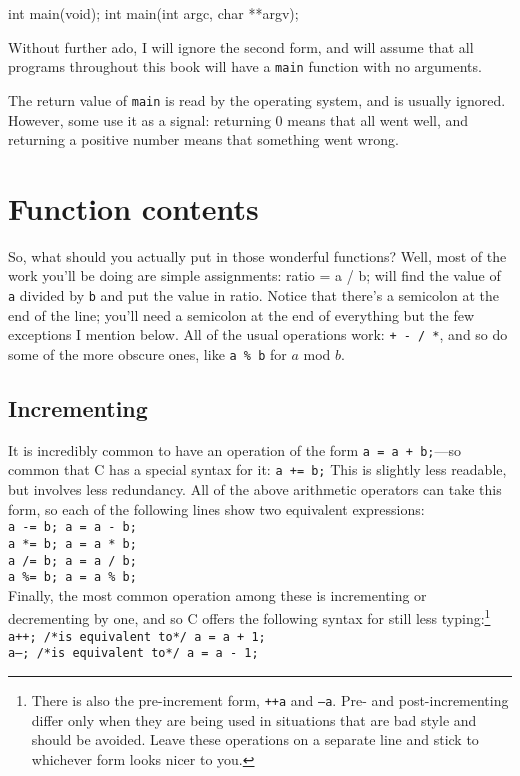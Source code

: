 \documentclass[12pt]{article}
\begin{document}
int main(void);
int main(int argc, char **argv);

Without further ado, I will ignore the second form, and will assume that all programs throughout this
book will have a {\tt main} function with no arguments.

The return value of {\tt main} is read by the operating system, and is usually ignored. However, some
use it as a signal:  returning 0 means that all went well, and returning a positive number means that
something went wrong.



\section{Function contents}

So, what should you actually put in those wonderful functions? Well, most of the work you'll be doing are
simple assignments:    \index{=}
ratio = a / b; 
will find the value of {\tt a} divided by {\tt b} and put the value in ratio. Notice that there's a
semicolon at the end of the line; you'll need a semicolon at the end of everything but the few
exceptions I mention below. All of the usual operations work: {\tt + - / *}, and so do some of the more
obscure ones, like {\tt a \% b} for $a$ mod $b$.  \index{\%}

\subsection{Incrementing} It is incredibly common to have an operation of the form {\tt a = a + b;}---so
common that C has a special syntax for it: {\tt a += b;} This is slightly less readable, but involves less
redundancy. All of the above arithmetic operators can take this form, so each of the following lines show two
equivalent expressions: \\
{\tt a -= b;  \phantom{Hello.}   a = a - b;\\
a *= b;  \phantom{Hello.}  a = a * b;\\
a /= b;  \phantom{Hello.}  a = a / b;\\
a \%= b;  \phantom{Hello.}  a = a \% b;\\}
Finally, the most common operation among these is incrementing or decrementing by one, and so C offers the
following syntax for still less typing:\footnote{There is also the pre-increment form, {\tt ++a} and
{\tt --a}. Pre- and post-incrementing differ only when they are being used in situations that are bad style and should
be avoided. Leave these operations on a separate line and stick to whichever form looks nicer to you.} \\
{\tt a++; /*is equivalent to*/ a = a + 1;\\
a--; /*is equivalent to*/ a = a - 1;}
\end{document}
